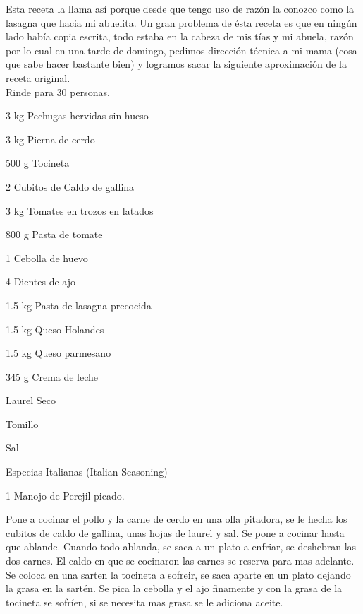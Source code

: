 Esta receta la llama así porque desde que tengo uso de razón la conozco como la lasagna que hacia mi abuelita. Un gran problema de ésta receta es que en ningún lado había copia escrita, todo estaba en la cabeza de mis tías y mi abuela, razón por lo cual en una tarde de domingo, pedimos dirección técnica a mi mama (cosa que sabe hacer bastante bien) y logramos sacar la siguiente aproximación de la receta original. \\

Rinde para 30 personas.

\begin{ingredientes}
\item 3 kg Pechugas hervidas sin hueso
\item 3 kg Pierna de cerdo
\item 500 g Tocineta
\item 2 Cubitos de Caldo de gallina
\item 3 kg Tomates en trozos en latados
\item 800 g Pasta de tomate
\item 1 Cebolla de huevo
\item 4 Dientes de ajo
\item 1.5 kg Pasta de lasagna precocida
\item 1.5 kg Queso Holandes
\item 1.5 kg Queso parmesano
\item 345 g Crema de leche
\item Laurel Seco
\item Tomillo
\item Sal
\item Especias Italianas (Italian Seasoning)
\item 1 Manojo de Perejil picado.
\end{ingredientes}
\preparacion
Pone a cocinar el pollo y la carne de cerdo en una olla pitadora, se le hecha los cubitos de caldo de gallina, unas hojas de laurel y sal. Se pone a cocinar hasta que ablande. Cuando todo ablanda, se saca a un plato a enfriar, se deshebran las dos carnes. El caldo en que se cocinaron las carnes se reserva para mas adelante.\\

Se coloca en una sarten la tocineta a sofreir, se saca aparte en un plato dejando la grasa en la sartén. Se pica la cebolla y el ajo finamente y con la grasa de la tocineta se sofríen, si se necesita mas grasa se le adiciona aceite.\\

